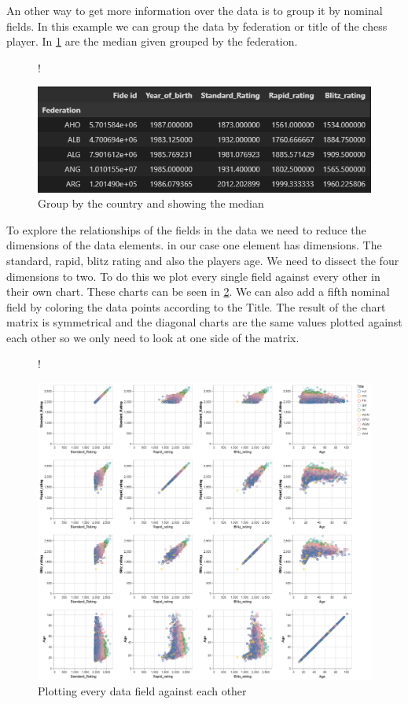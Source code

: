 \documentclass[a4paper, 12pt, oneside]{scrbook}
\begin{document}
			\noindent An other way to get more information over the data is to group it by nominal fields. In this example we can group the data by federation or title of the chess player. In \ref{fig:groupeby} are the median given grouped by the federation.
			
			\begin{figure} [H]
				\centering
				\resizebox{\linewidth} {!} {
					\includegraphics{res/groupby.png}
					
				}
				\caption{Group by the country and showing the median}
				\label{fig:groupeby}
			\end{figure}
			
			To explore the relationships of the fields in the data we need to reduce the dimensions of the data elements. in our case one element has  dimensions. The standard, rapid, blitz rating and also the players age. We need to dissect the four dimensions to two. To do this we plot every single field against every other in their own chart. These charts can be seen in \ref{fig:crosschart}. We can also add a fifth nominal field by coloring the data points according to the Title. The result of the chart matrix is symmetrical and the diagonal charts are the same values plotted against each other so we only need to look at one side of the matrix.
			
			\begin{figure} [H]
				\centering
				\resizebox{\linewidth} {!} {
					\includegraphics{res/crosschart.png}
					
				}
				\caption{Plotting every data field against each other}
				\label{fig:crosschart}
			\end{figure}
			
\end{document}

